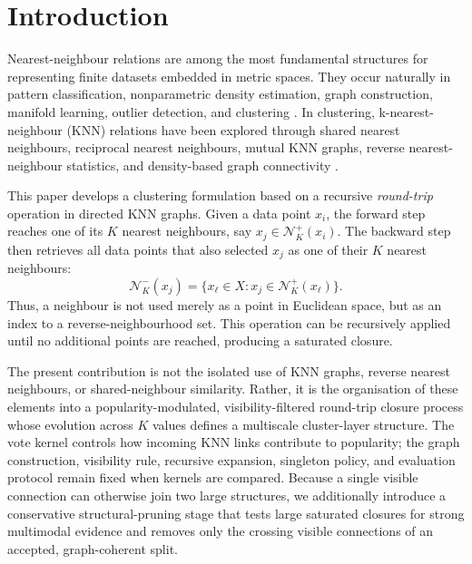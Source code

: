 \documentclass[pdflatex,sn-mathphys-num]{sn-jnl}
\newcommand{\calN}{\mathcal{N}}
\begin{document}

\maketitle


\section{Introduction}\label{sec:introduction}

Nearest-neighbour relations are among the most fundamental structures for representing finite datasets embedded in metric spaces. They occur naturally in pattern classification, nonparametric density estimation, graph construction, manifold learning, outlier detection, and clustering \citep{CoverHart1967,LoftsgaardenQuesenberry1965,Bentley1975,FriedmanBentleyFinkel1977,VonLuxburg2007}. In clustering, k-nearest-neighbour (KNN) relations have been explored through shared nearest neighbours, reciprocal nearest neighbours, mutual KNN graphs, reverse nearest-neighbour statistics, and density-based graph connectivity \citep{JarvisPatrick1973,Ertoz2003SNN,BritoChavezQuirozYukich1997,GowdaKrishna1978,ChowdhuryAmorim2018,XieLeeWangChenZhou2019}.

This paper develops a clustering formulation based on a recursive \emph{round-trip} operation in directed KNN graphs. Given a data point $x_i$, the forward step reaches one of its $K$ nearest neighbours, say $x_j\in\calN_K^+(x_i)$. The backward step then retrieves all data points that also selected $x_j$ as one of their $K$ nearest neighbours:
\begin{equation}
\calN_K^-(x_j)=\{x_\ell\in X: x_j\in\calN_K^+(x_\ell)\}.
\end{equation}
Thus, a neighbour is not used merely as a point in Euclidean space, but as an index to a reverse-neighbourhood set. This operation can be recursively applied until no additional points are reached, producing a saturated closure.

The present contribution is not the isolated use of KNN graphs, reverse nearest neighbours, or shared-neighbour similarity. Rather, it is the organisation of these elements into a popularity-modulated, visibility-filtered round-trip closure process whose evolution across $K$ values defines a multiscale cluster-layer structure. The vote kernel controls how incoming KNN links contribute to popularity; the graph construction, visibility rule, recursive expansion, singleton policy, and evaluation protocol remain fixed when kernels are compared. Because a single visible connection can otherwise join two large structures, we additionally introduce a conservative structural-pruning stage that tests large saturated closures for strong multimodal evidence and removes only the crossing visible connections of an accepted, graph-coherent split.
\end{document}

